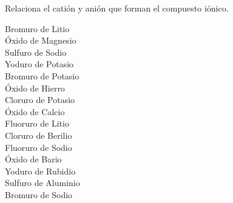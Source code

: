 \question[10]  Relaciona el catión y anión que forman el compuesto iónico.
\begin{center}
    \begin{minipage}[t]{0.4\textwidth}
        \begin{choices}
            \choice Bromuro de Litio    \\[-0.4em]      %
            \choice Óxido de Magnesio   \\[-0.4em]      %
            \choice Sulfuro  de Sodio   \\[-0.4em]      %
            \choice Yoduro de Potasio   \\[-0.4em]      %
            \choice Bromuro de Potasio  \\[-0.4em]      %
            \choice Óxido de Hierro     \\[-0.4em]      %
            \choice Cloruro de Potasio  \\[-0.4em]      %
            \choice Óxido de Calcio     \\[-0.4em]      %
            \choice Fluoruro de Litio   \\[-0.4em]      %
            \choice Cloruro de Berilio  \\[-0.4em]      %
            \choice Fluoruro de Sodio   \\[-0.4em]      %
            \choice Óxido de Bario      \\[-0.4em]      %
            \choice Yoduro de Rubidio   \\[-0.4em]      %
            \choice Sulfuro de Aluminio \\[-0.4em]      %
            \choice Bromuro de Sodio    \\[-0.4em]      %
        \end{choices}
    \end{minipage}%
    \begin{minipage}[t]{0.3\textwidth}
\end{minipage}
\end{center}
